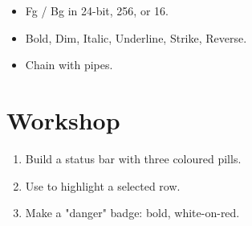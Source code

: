 \begin{recap}
\begin{itemize}[leftmargin=*]
  \item Fg / Bg in 24-bit, 256, or 16.
  \item Bold, Dim, Italic, Underline, Strike, Reverse.
  \item Chain with pipes.
\end{itemize}
\end{recap}

\section*{Workshop}

\begin{enumerate}[leftmargin=*]
  \item Build a status bar with three coloured pills.
  \item Use  to highlight a selected row.
  \item Make a "danger" badge: bold, white-on-red.
\end{enumerate}
